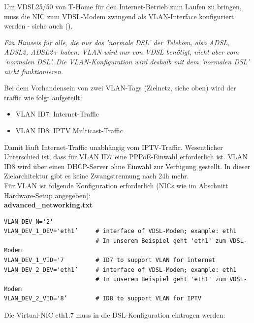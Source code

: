 Um VDSL25/50 von T-Home für den Internet-Betrieb zum Laufen zu bringen, muss die
NIC zum VDSL-Modem zwingend als VLAN-Interface konfiguriert werden - siehe auch
().

\vspace{3mm}
\emph{Ein Hinweis für alle, die nur das 'normale DSL' der Telekom, also ADSL,
ADSL2, ADSL2+ haben: VLAN wird nur von VDSL benötigt, nicht aber vom 'normalen
DSL'. Die VLAN-Konfiguration wird deshalb mit dem 'normalen DSL' nicht
funktionieren.}
\vspace{3mm}

Bei dem Vorhandensein von zwei VLAN-Tags (Zielnetz, siehe oben) wird der
traffic wie folgt aufgeteilt:

\begin{itemize}
   \item{VLAN ID7: Internet-Traffic}
   \item{VLAN ID8: IPTV Multicast-Traffic}
\end{itemize}

Damit läuft Internet-Traffic unabhängig vom IPTV-Traffic. Wesentlicher
Unterschied ist, dass für VLAN ID7 eine PPPoE-Einwahl erforderlich ist.
VLAN ID8 wird über einen DHCP-Server ohne Einwahl zur Verfügung gestellt.
In dieser Zielarchitektur gibt es keine Zwangstrennung nach 24h mehr.\\

Für VLAN ist folgende Konfiguration erforderlich (NICs wie im Abschnitt
Hardware-Setup angegeben):\\

\noindent \textbf{advanced\_networking.txt}

\begin{example}
\begin{verbatim}
VLAN_DEV_N='2'
VLAN_DEV_1_DEV='eth1’     # interface of VDSL-Modem; example: eth1
                          # In unserem Beispiel geht 'eth1' zum VDSL-Modem
VLAN_DEV_1_VID='7         # ID7 to support VLAN for internet
VLAN_DEV_2_DEV='eth1’     # interface of VDSL-Modem; example: eth1
                          # In unserem Beispiel geht 'eth1' zum VDSL-Modem
VLAN_DEV_2_VID='8’        # ID8 to support VLAN for IPTV
\end{verbatim}
\end{example}

\noindent Die Virtual-NIC eth1.7 muss in die DSL-Konfiguration eintragen
werden:\\

